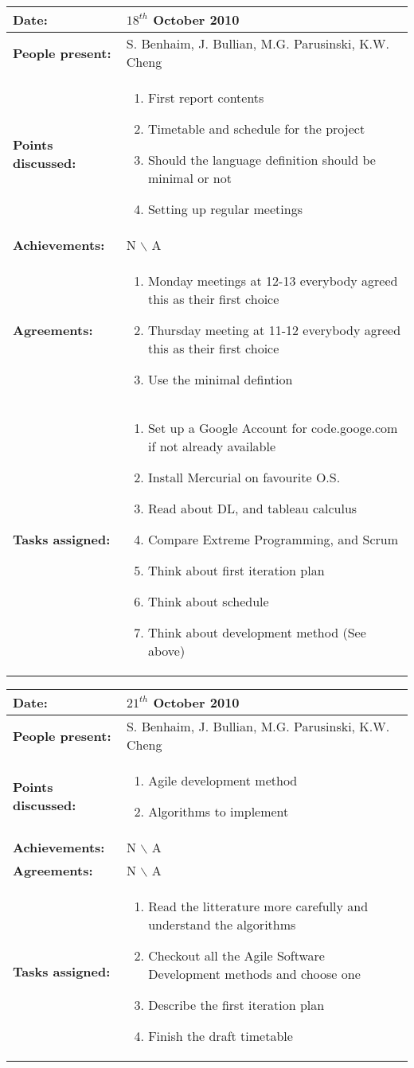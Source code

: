\documentclass[12pt,a4paper]{article}
\newcommand{\meeting}[6]{%
\begin{center}%
\begin{longtable}{| p{3.5cm}  | p{13cm} |}%
\hline%
\textbf{Date:} & #1 \\%
\hline%
\textbf{People present:} &#2 \\%
\hline%
\textbf{Points discussed:} &#3\\%
\hline%
\textbf{Achievements:} &#4 \\%
\hline%
\textbf{Agreements:} &#5 \\%
\hline%
\textbf{Tasks assigned:} &#6  \\%
\hline%
\end{longtable}%
\end{center}%
\bigbreak
}
\begin{document}
\meeting{$18^{th}$ October 2010}%
{S. Benhaim, J. Bullian, M.G. Parusinski, K.W. Cheng}%
{ \begin{enumerate} \item First report contents
\item Timetable and schedule for the project
\item Should the language definition should be minimal or not
\item Setting up regular meetings
\end{enumerate} }%
{ N $\backslash$ A}%
{\begin{enumerate}
\item Monday meetings at 12-13 everybody agreed this as their first choice
\item Thursday meeting at 11-12 everybody agreed this as their first choice
\item Use the minimal defintion
\end{enumerate}}
{ \begin{enumerate}
\item Set up a Google Account for code.googe.com if not already available
\item Install Mercurial on favourite O.S.
\item Read about DL, and tableau calculus
\item Compare Extreme Programming, and Scrum
\item Think about first iteration plan
\item Think about schedule
\item Think about development method (See above)
\end{enumerate}}%

\meeting{$21^{th}$ October 2010}%
{S. Benhaim, J. Bullian, M.G. Parusinski, K.W. Cheng}%
{ \begin{enumerate} 
\item Agile development method
\item Algorithms to implement
\end{enumerate} }%
{ N $\backslash$ A}%
{N $\backslash$ A}
{ \begin{enumerate}
\item Read the litterature more carefully and understand the algorithms
\item Checkout all the Agile Software Development methods and choose one
\item Describe the first iteration plan
\item Finish the draft timetable
\end{enumerate}}%
\end{document}
